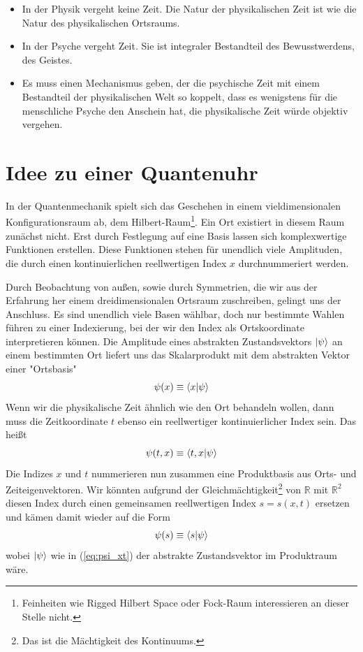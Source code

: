 \documentclass[12pt]{article}
\begin{document}
\begin{itemize}
\item In der Physik vergeht keine Zeit. Die Natur der physikalischen Zeit ist wie die Natur des physikalischen Ortsraums.
\item In der Psyche vergeht Zeit. Sie ist integraler Bestandteil des Bewusstwerdens, des Geistes. 
\item Es muss einen Mechanismus geben, der die psychische Zeit mit einem Bestandteil der physikalischen Welt so koppelt, dass es wenigstens für die menschliche Psyche den Anschein hat, die physikalische Zeit würde objektiv vergehen.
\end{itemize}

\section{Idee zu einer Quantenuhr}

In der Quantenmechanik spielt sich das Geschehen in einem vieldimensionalen Konfigurationsraum ab, dem Hilbert-Raum\footnote{Feinheiten wie Rigged Hilbert Space oder Fock-Raum interessieren an dieser Stelle nicht.}. Ein Ort existiert in diesem Raum zunächst nicht. Erst durch Festlegung auf eine Basis lassen sich komplexwertige Funktionen erstellen. Diese Funktionen stehen für unendlich viele Amplituden, die durch einen kontinuierlichen reellwertigen Index $x$ durchnummeriert werden.

Durch Beobachtung von außen, sowie durch Symmetrien, die wir aus der Erfahrung her einem dreidimensionalen Ortsraum zuschreiben, gelingt uns der Anschluss. Es sind unendlich viele Basen wählbar, doch nur bestimmte Wahlen führen zu einer Indexierung, bei der wir den Index als Ortskoordinate interpretieren können. Die Amplitude eines abstrakten Zustandsvektors $\ket{\psi}$ an einem bestimmten Ort liefert uns das Skalarprodukt mit dem abstrakten Vektor einer "Ortsbasis"
\begin{equation} 
\psi(x) \equiv \bra{x}\ket{\psi} 
\end{equation}
Wenn wir die physikalische Zeit ähnlich wie den Ort behandeln wollen, dann muss die Zeitkoordinate $t$ ebenso ein reellwertiger kontinuierlicher Index sein. Das heißt
\begin{equation} 
\label{eq:psi_xt}
\psi(t,x) \equiv \bra{t,x}\ket{\psi} 
\end{equation}
Die Indizes $x$ und $t$ nummerieren nun zusammen eine Produktbasis aus Orts- und Zeiteigenvektoren. Wir könnten aufgrund der Gleichmächtigkeit\footnote{Das ist die Mächtigkeit des Kontinuums.} von $\mathbb{R}$ mit $\mathbb{R}^2$ diesen Index durch einen gemeinsamen reellwertigen Index $s = s(x,t)$ ersetzen und kämen damit wieder auf die Form
\begin{equation}
\label{eq:psi_s}
\psi(s) \equiv \bra{s}\ket{\psi} 
\end{equation}
wobei $\ket{\psi}$ wie in (\ref{eq:psi_xt}) der abstrakte Zustandsvektor im Produktraum wäre.
\end{document}
